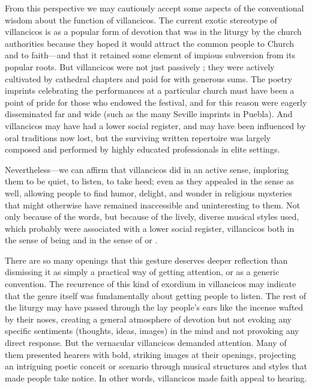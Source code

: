 From this perspective we may cautiously accept some aspects of the conventional wisdom about the function of villancicos.
The current exotic stereotype of villancicos is as a popular form of devotion that was  in the liturgy by the church authorities because they hoped it would attract the common people to Church and to faith---and that it retained some element of impious subversion from its popular roots.
But villancicos were not just passively ; they were actively cultivated by cathedral chapters and paid for with generous sums.
The poetry imprints celebrating the performances at a particular church must have been a point of pride for those who endowed the festival, and for this reason were eagerly disseminated far and wide (such as the many Seville imprints in Puebla).
And villancicos may have had a lower social register, and may have been influenced by oral traditions now lost, but the surviving written repertoire was largely composed and performed by highly educated professionals in elite settings.

Nevertheless---we can affirm that villancicos did  in an active sense, imploring them to be quiet, to listen, to take heed; even as they appealed in the  sense as well, allowing people to find humor, delight, and wonder in religious mysteries that might otherwise have remained inaccessible and uninteresting to them.
Not only because of the words, but because of the lively, diverse musical styles used, which probably were associated with a lower social register, villancicos  both in the sense of being  and in the sense of  or .

There are so many  openings that this gesture deserves deeper reflection than dismissing it as simply a practical way of getting attention, or as a generic convention. 
The recurrence of this kind of exordium in villancicos may indicate that the genre itself was fundamentally about getting people to listen.
The rest of the liturgy may have passed through the lay people's ears like the incense wafted by their noses, creating a general atmosphere of devotion but not evoking any specific sentiments (thoughts, ideas, images) in the mind and not provoking any direct response.
But the vernacular villancicos demanded attention.
Many of them presented hearers with bold, striking images at their openings, projecting an intriguing poetic conceit or scenario through musical structures and styles that made people take notice. 
In other words, villancicos made faith appeal to hearing.

